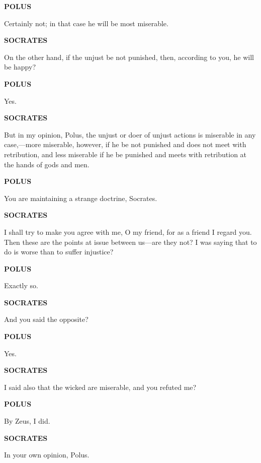 \documentclass[11pt,letter]{article}
\begin{document}
\par \textbf{POLUS}
\par   Certainly not; in that case he will be most miserable.

\par \textbf{SOCRATES}
\par   On the other hand, if the unjust be not punished, then, according to you, he will be happy?

\par \textbf{POLUS}
\par   Yes.

\par \textbf{SOCRATES}
\par   But in my opinion, Polus, the unjust or doer of unjust actions is miserable in any case,—more miserable, however, if he be not punished and does not meet with retribution, and less miserable if he be punished and meets with retribution at the hands of gods and men.

\par \textbf{POLUS}
\par   You are maintaining a strange doctrine, Socrates.

\par \textbf{SOCRATES}
\par   I shall try to make you agree with me, O my friend, for as a friend I regard you. Then these are the points at issue between us—are they not? I was saying that to do is worse than to suffer injustice?

\par \textbf{POLUS}
\par   Exactly so.

\par \textbf{SOCRATES}
\par   And you said the opposite?

\par \textbf{POLUS}
\par   Yes.

\par \textbf{SOCRATES}
\par   I said also that the wicked are miserable, and you refuted me?

\par \textbf{POLUS}
\par   By Zeus, I did.

\par \textbf{SOCRATES}
\par   In your own opinion, Polus.
\end{document}
